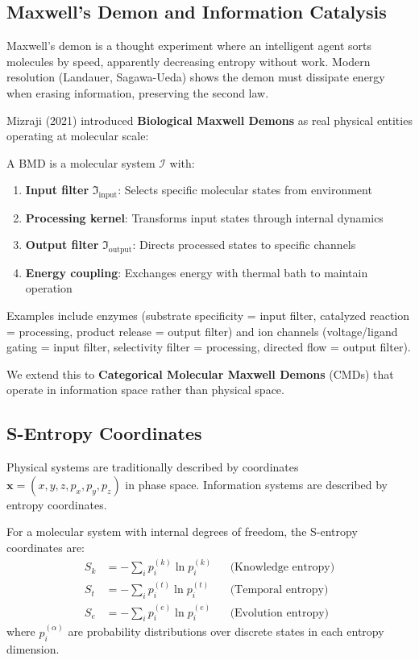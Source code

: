 
\subsection{Maxwell's Demon and Information Catalysis}

Maxwell's demon is a thought experiment where an intelligent agent sorts molecules by speed, apparently decreasing entropy without work. Modern resolution (Landauer, Sagawa-Ueda) shows the demon must dissipate energy when erasing information, preserving the second law.

Mizraji (2021) introduced \textbf{Biological Maxwell Demons} as real physical entities operating at molecular scale:

\begin{definition}
A BMD is a molecular system $\mathscr{I}$ with:
\begin{enumerate}
\item \textbf{Input filter} $\mathfrak{I}_{\text{input}}$: Selects specific molecular states from environment
\item \textbf{Processing kernel}: Transforms input states through internal dynamics
\item \textbf{Output filter} $\mathfrak{I}_{\text{output}}$: Directs processed states to specific channels
\item \textbf{Energy coupling}: Exchanges energy with thermal bath to maintain operation
\end{enumerate}
\end{definition}

Examples include enzymes (substrate specificity = input filter, catalyzed reaction = processing, product release = output filter) and ion channels (voltage/ligand gating = input filter, selectivity filter = processing, directed flow = output filter).

We extend this to \textbf{Categorical Molecular Maxwell Demons} (CMDs) that operate in information space rather than physical space.

\subsection{S-Entropy Coordinates}

Physical systems are traditionally described by coordinates $\mathbf{x} = (x, y, z, p_x, p_y, p_z)$ in phase space. Information systems are described by entropy coordinates.

\begin{definition}
For a molecular system with internal degrees of freedom, the S-entropy coordinates are:
\begin{align}
S_k &= -\sum_i p_i^{(k)} \ln p_i^{(k)} && \text{(Knowledge entropy)} \\
S_t &= -\sum_i p_i^{(t)} \ln p_i^{(t)} && \text{(Temporal entropy)} \\
S_e &= -\sum_i p_i^{(e)} \ln p_i^{(e)} && \text{(Evolution entropy)}
\end{align}
where $p_i^{(\alpha)}$ are probability distributions over discrete states in each entropy dimension.
\end{definition}

